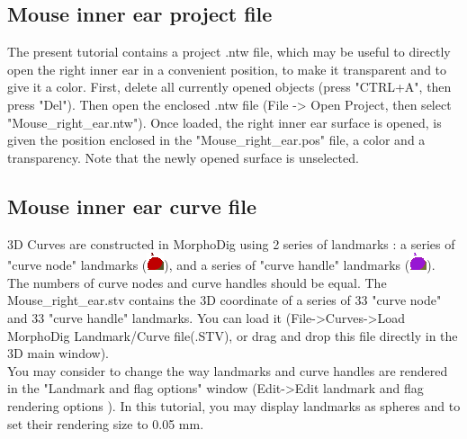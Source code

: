 \documentclass[12pt, a4paper]{book}
\begin{document}
\subsection{Mouse inner ear project file}
The present tutorial contains a project .ntw file, which may be useful to directly open the right inner ear
 in a convenient position, to make it transparent and to give it a color. First, delete all currently opened objects
(press "CTRL+A", then press "Del"). Then open the enclosed .ntw file (File -> Open Project, then select
"Mouse\_right\_ear.ntw"). Once loaded, the right inner ear surface is opened, is given the position
enclosed in the "Mouse\_right\_ear.pos" file, a color and a transparency. Note that the newly opened
surface is unselected.\\

\subsection{Mouse inner ear curve file}
3D Curves are constructed in MorphoDig using 2 series of landmarks : a series of "curve node" landmarks (\includegraphics[scale=0.7]{../images/04/curve_nodes.png}),
and a series of "curve handle" landmarks (\includegraphics[scale=0.7]{../images/04/curve_handles.png}). The numbers of curve nodes and curve handles should be equal. The Mouse\_right\_ear.stv contains the 3D coordinate of a series of  33 "curve node" and 33 "curve handle" landmarks. You can load it (File->Curves->Load MorphoDig Landmark/Curve file(.STV), or drag and drop this file directly in the 3D main window).\\

You may consider to change the way landmarks and curve handles are rendered in the "Landmark and flag options" window (Edit->Edit landmark and flag rendering options ). In this tutorial, you may display landmarks as spheres and to set their rendering size to 0.05 mm.\\
\end{document}
